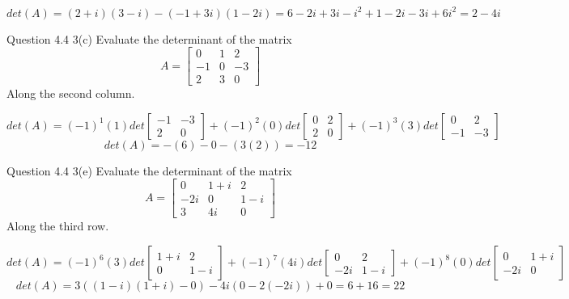 \documentclass[answers,12pt,addpoints]{exam}
\begin{document}
\begin{questions}
    \begin{solution}
        $$det(A) = (2+i)(3-i) - (-1 + 3i)(1 - 2i) = 6 - 2i + 3i - i^2 + 1 - 2i - 3i + 6i^2 = 2 - 4i$$
    \end{solution}
    \item Question 4.4 3(c)
    Evaluate the determinant of the matrix
    $$ A = \begin{bmatrix}
        0 & 1 & 2\\
        -1 & 0 & -3\\
        2 & 3 & 0
    \end{bmatrix}$$
    Along the second column.
    \begin{solution}
        $$det(A) = (-1)^{1} (1) det\begin{bmatrix}
            -1 & -3\\
            2 & 0
        \end{bmatrix} + (-1)^{2} (0) det\begin{bmatrix}
            0 & 2\\
            2 & 0
        \end{bmatrix} + (-1)^{3} (3) det\begin{bmatrix}
            0 & 2\\
            -1 & -3
        \end{bmatrix}$$
        $$det(A) = -(6) - 0 - (3(2)) = -12$$
    \end{solution}
    \item Question 4.4 3(e)
    Evaluate the determinant of the matrix
    $$ A = \begin{bmatrix}
        0 & 1 +i & 2\\
        -2i & 0 & 1 -i\\
        3 & 4i & 0
    \end{bmatrix}$$
    Along the third row.
    \begin{solution}
        $$det(A) = (-1)^{6} (3) det\begin{bmatrix}
            1 + i & 2\\
            0 & 1 - i
        \end{bmatrix} + (-1)^{7} (4i) det\begin{bmatrix}
            0 & 2\\
            -2i & 1 - i
        \end{bmatrix} + (-1)^{8} (0) det\begin{bmatrix}
            0 & 1 + i\\
            -2i & 0
        \end{bmatrix}$$
        $$det(A) = 3((1 - i)(1+i) - 0) - 4i(0 - 2(-2i)) + 0 = 6 +16 = 22$$
    \end{solution}
\end{questions}
\end{document}
